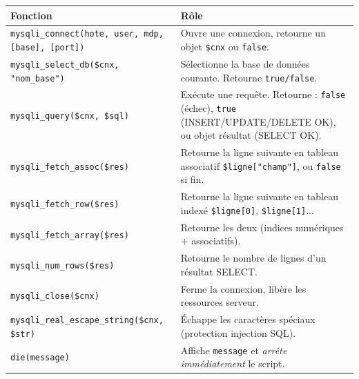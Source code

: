 \documentclass[11pt]{article}
\begin{document}
\begin{propriete}
\begin{center}
\begin{tabularx}{\linewidth}{|l|X|}\hline
\textbf{Fonction} & \textbf{Rôle} \\\hline
\texttt{mysqli\_connect(hote, user, mdp, [base], [port])} & Ouvre une connexion, retourne un objet \texttt{\$cnx} ou \texttt{false}. \\\hline
\texttt{mysqli\_select\_db(\$cnx, "nom\_base")} & Sélectionne la base de données courante. Retourne \texttt{true/false}. \\\hline
\texttt{mysqli\_query(\$cnx, \$sql)} & Exécute une requête. Retourne : \texttt{false} (échec), \texttt{true} (INSERT/UPDATE/DELETE OK), ou objet résultat (SELECT OK). \\\hline
\texttt{mysqli\_fetch\_assoc(\$res)} & Retourne la ligne suivante en tableau associatif \texttt{\$ligne["champ"]}, ou \texttt{false} si fin. \\\hline
\texttt{mysqli\_fetch\_row(\$res)} & Retourne la ligne suivante en tableau indexé \texttt{\$ligne[0]}, \texttt{\$ligne[1]}... \\\hline
\texttt{mysqli\_fetch\_array(\$res)} & Retourne les deux (indices numériques + associatifs). \\\hline
\texttt{mysqli\_num\_rows(\$res)} & Retourne le nombre de lignes d'un résultat SELECT. \\\hline
\texttt{mysqli\_close(\$cnx)} & Ferme la connexion, libère les ressources serveur. \\\hline
\texttt{mysqli\_real\_escape\_string(\$cnx, \$str)} & Échappe les caractères spéciaux (protection injection SQL). \\\hline
\texttt{die(message)} & Affiche \texttt{message} et \emph{arrête immédiatement} le script. \\\hline
\end{tabularx}
\end{center}
\end{propriete}
\end{document}

